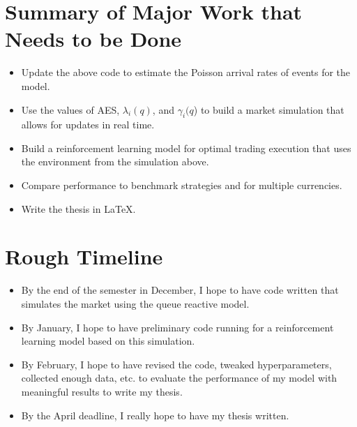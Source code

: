 \section{Summary of Major Work that Needs to be Done}
\begin{itemize}
\item Update the above code to estimate the Poisson arrival rates of events for the model.
\item Use the values of AES, $\lambda_i(q)$, and $\gamma_i(q$) to build a market simulation that allows for updates in real time.
\item Build a reinforcement learning model for optimal trading execution that uses the environment from the simulation above.
\item Compare performance to benchmark strategies and for multiple currencies.
\item Write the thesis in \LaTeX{}.
\end{itemize}

\section{Rough Timeline}
\begin{itemize}
\item By the end of the semester in December, I hope to have code written that simulates the market using the queue reactive model.
\item By January, I hope to have preliminary code running for a reinforcement learning model based on this simulation.
\item By February, I hope to have revised the code, tweaked hyperparameters, collected enough data, etc. to evaluate the performance of my model with meaningful results to write my thesis.
\item By the April deadline, I really hope to have my thesis written.
\end{itemize}
